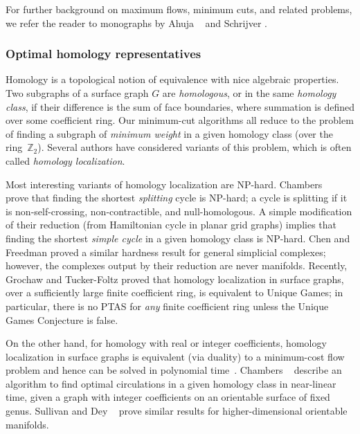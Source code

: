 \documentclass[letterpaper,review]{siamart190516}
\def\Z{\mathbb{Z}}
\def\anote#1{\color{purple}Amir: #1 \color{black}}
\def\rnote#1{\color{red}Review: #1 \color{black}}
\begin{document}
For further background on maximum flows, minimum cuts, and related problems, we refer the reader to monographs by Ahuja \etal\ \cite{amo-nftaa-93} and Schrijver \cite{s-cape-03}.

\subsubsection*{Optimal homology representatives}

Homology is a topological notion of equivalence with nice algebraic properties.  Two subgraphs of a surface graph $G$ are \emph{homologous}, or in the same \emph{homology class}, if their difference is the sum of face boundaries, where summation is defined over some coefficient ring.  Our minimum-cut algorithms all reduce to the problem of finding a subgraph of \emph{minimum weight} in a given homology class (over the ring~$\Z_2$).  Several  authors have considered variants of this problem, which is often called \emph{homology localization}.

Most interesting variants of homology localization are NP-hard.  Chambers \etal~\cite{ccelw-scsih-08} prove that finding the shortest \emph{splitting} cycle is {NP}-hard; a cycle is splitting if it is non-self-crossing, non-contractible, and null-homologous.  A simple modification of their reduction (from Hamiltonian cycle in planar grid graphs) implies that finding the shortest \emph{simple cycle} in a given homology class is {NP}-hard.  Chen and Freedman \cite{cf-qhc-08, cf-qhc2-07} proved a similar hardness result for general simplicial complexes; however, the complexes output by their reduction are never manifolds.  Recently, Grochaw and Tucker-Foltz \cite{gt-ctugc-18} proved that homology localization in surface graphs, over a sufficiently large finite coefficient ring, is equivalent to Unique Games; in particular, there is no PTAS for \emph{any} finite coefficient ring unless the Unique Games Conjecture is false.

On the other hand, for homology with real or integer coefficients, homology localization in surface graphs is equivalent (via duality) to a minimum-cost flow problem and hence can be solved in polynomial time~\cite{cen-hfcc-12, s-cath-90}.  Chambers \etal~\cite{cen-hfcc-12} describe an algorithm to find optimal circulations in a given homology class in near-linear time, given a graph with integer coefficients on an orientable surface of fixed genus.  Sullivan \cite{s-cath-90} and Dey \etal\ \cite{dhk-ohctu-11} prove similar results for higher-dimensional orientable manifolds.
\end{document}
